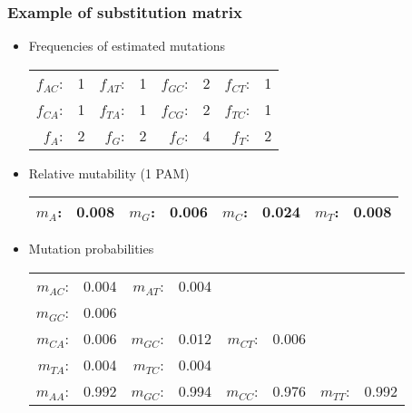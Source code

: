 \subsubsection*{Example of substitution matrix}
\begin{itemize}
\item Frequencies of estimated mutations

\begin{table}[H]
\centering
\begin{tabular}{|rl|rl|rl|rl|}
\hline
$f_{AC}$: & 1  & $f_{AT}$: & 1 & $f_{GC}$: & 2 & $f_{CT}$: & 1  \\ \arrayrulecolor{lightgray} \hline \arrayrulecolor{black} 
$f_{CA}$: & 1  & $f_{TA}$: & 1 & $f_{CG}$: & 2 & $f_{TC}$: & 1  \\ \arrayrulecolor{lightgray} \hline \arrayrulecolor{black} 
$f_{A}$: & 2  & $f_{G}$: & 2 & $f_{C}$: & 4 & $f_{T}$: & 2 \\ \hline
\end{tabular}
\end{table}

\item Relative mutability (1 PAM)

\begin{table}[H]
\centering
\begin{tabular}{|rl|rl|rl|rl|}
\hline
$m_{A}$: & 0.008  & $m_{G}$: & 0.006 & $m_{C}$: & 0.024 & $m_{T}$: & 0.008 \\ \hline
\end{tabular}
\end{table}

\item Mutation probabilities

\begin{table}[H]
\centering
\begin{tabular}{|rl|rl|rl|rl|}
\hline
$m_{AC}$: & 0.004  & $m_{AT}$: & 0.004 &  &  &  &  \\ \arrayrulecolor{lightgray} \hline \arrayrulecolor{black} 
$m_{GC}$: & 0.006  & &  & &  &  &   \\ \arrayrulecolor{lightgray} \hline \arrayrulecolor{black} 
$m_{CA}$: & 0.006  & $m_{GC}$: & 0.012 & $m_{CT}$: & 0.006 &  &  \\ \arrayrulecolor{lightgray} \hline \arrayrulecolor{black} 
$m_{TA}$: & 0.004  & $m_{TC}$: & 0.004 &  &  &  &   \\ \arrayrulecolor{lightgray} \hline \arrayrulecolor{black} 
$m_{AA}$: & 0.992  & $m_{GC}$: & 0.994 & $m_{CC}$: & 0.976 & $m_{TT}$: & 0.992 \\ \hline
\end{tabular}
\end{table}


\end{itemize}
